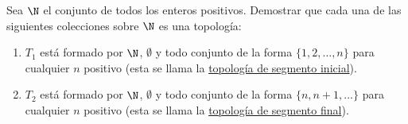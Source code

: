 \begin{ejer}
    Sea $\N$ el conjunto de todos los enteros positivos. Demostrar que cada una de las siguientes colecciones sobre $\N$ es una topología:
    
    \begin{enumerate}
        \item $T_1$ está formado por $\N$, $\emptyset$ y todo conjunto de la forma $\{1, 2, \dots, n\}$ para cualquier $n$ positivo (esta se llama la \ul{topología de segmento inicial}).
        
        \item $T_2$ está formado por $\N$, $\emptyset$ y todo conjunto de la forma $\{n, n+1, \dots\}$ para cualquier $n$ positivo (esta se llama la \ul{topología de segmento final}).
    \end{enumerate}
\end{ejer}

